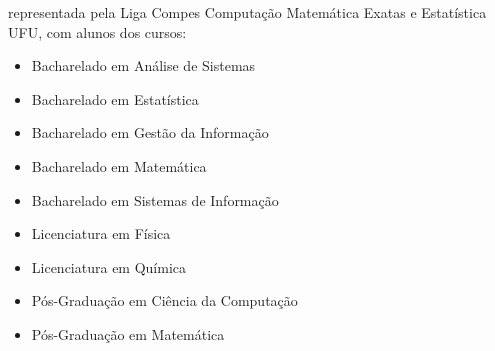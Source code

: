 \begin{article}
\begin{description}[noitemsep]
		\item[UFU] representada pela Liga Compes Computação Matemática Exatas e Estatística UFU, com alunos dos cursos:
		\begin{itemize}[noitemsep]
			\item Bacharelado em Análise de Sistemas
			\item Bacharelado em Estatística
			\item Bacharelado em Gestão da Informação
			\item Bacharelado em Matemática
			\item Bacharelado em Sistemas de Informação
			\item Licenciatura em Física
			\item Licenciatura em Química 
			\item Pós-Graduação em Ciência da Computação
			\item Pós-Graduação em Matemática
		\end{itemize}
	\end{description}
\end{article}
